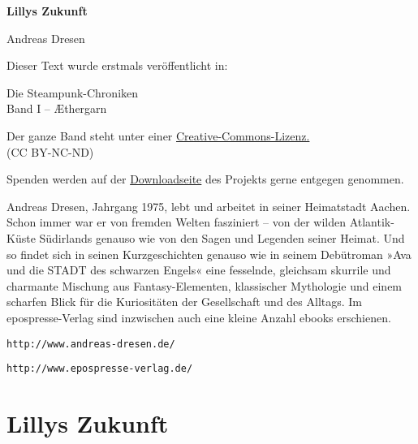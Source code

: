 \usepackage[ngerman]{babel}
\usepackage[T1]{fontenc}



\renewcommand*{\tb}{\begin{center}* \quad * \quad *\end{center}}

\newcommand\bigpar\medskip


\raggedbottom
\begin{center}
\textbf{\huge\textsf{Lillys Zukunft}}

\medskip
Andreas Dresen
\end{center}

\bigskip

\begin{flushleft}
Dieser Text wurde erstmals veröffentlicht in:
\begin{center}
Die Steampunk-Chroniken\\
Band I -- Æthergarn
\end{center}

\bigskip

Der ganze Band steht unter einer
\href{http://creativecommons.org/licenses/by-nc-nd/2.0/de/}{Creative-Commons-Lizenz.} \\
(CC BY-NC-ND)

\bigskip

Spenden werden auf der
\href{http://steampunk-chroniken.de/download}{Downloadseite}
des Projekts gerne entgegen genommen.

\vfill

Andreas Dresen, Jahrgang 1975, lebt und arbeitet in seiner
Heimatstadt Aachen. Schon immer war er von fremden Welten
fasziniert – von der wilden Atlantik-Küste Südirlands genauso wie
von den Sagen und Legenden seiner Heimat. Und so findet sich in
seinen Kurzgeschichten genauso wie in seinem Debütroman »Ava und
die STADT des schwarzen Engels« eine fesselnde, gleichsam skurrile
und charmante Mischung aus Fantasy-Elementen, klassischer
Mythologie und einem scharfen Blick für die Kuriositäten der
Gesellschaft und des Alltags. Im epospresse-Verlag sind inzwischen
auch eine kleine Anzahl ebooks erschienen.

\bigpar

\texttt{http://www.andreas-dresen.de/}

\texttt{http://www.epospresse-verlag.de/}
\end{flushleft}

\section{Lillys Zukunft}

